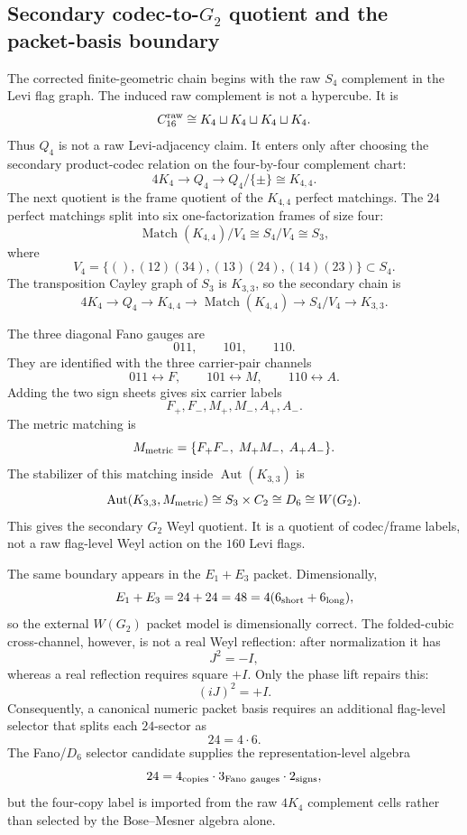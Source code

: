 
\subsection{Secondary codec-to-$G_2$ quotient and the packet-basis boundary}
\label{sec:bt682-secondary-g2-synthesis}

The corrected finite-geometric chain begins with the raw $S_4$ complement in the Levi flag graph.  The induced raw complement is not a hypercube.  It is
\[
C_{16}^{\rm raw}\cong K_4\sqcup K_4\sqcup K_4\sqcup K_4.
\]
Thus $Q_4$ is not a raw Levi-adjacency claim.  It enters only after choosing the secondary product-codec relation on the four-by-four complement chart:
\[
4K_4
\longrightarrow
Q_4
\longrightarrow
Q_4/\{\pm\}\cong K_{4,4}.
\]
The next quotient is the frame quotient of the $K_{4,4}$ perfect matchings.  The $24$ perfect matchings split into six one-factorization frames of size four:
\[
\operatorname{Match}(K_{4,4})/V_4
\cong
S_4/V_4
\cong S_3,
\]
where
\[
V_4=\{(),(12)(34),(13)(24),(14)(23)\}\subset S_4.
\]
The transposition Cayley graph of $S_3$ is $K_{3,3}$, so the secondary chain is
\[
4K_4
\to Q_4
\to K_{4,4}
\to \operatorname{Match}(K_{4,4})
\to S_4/V_4
\to K_{3,3}.
\]

The three diagonal Fano gauges are
\[
011,\qquad 101,\qquad 110.
\]
They are identified with the three carrier-pair channels
\[
011\leftrightarrow F,\qquad
101\leftrightarrow M,\qquad
110\leftrightarrow A.
\]
Adding the two sign sheets gives six carrier labels
\[
F_+,F_-,M_+,M_-,A_+,A_-.
\]
The metric matching is
\[
M_{\rm metric}=\{F_+F_-,\;M_+M_-,\;A_+A_-\}.
\]
The stabilizer of this matching inside $\operatorname{Aut}(K_{3,3})$ is
\[
\operatorname{Aut}(K_{3,3},M_{\rm metric})
\cong
S_3\times C_2
\cong D_6
\cong W(G_2).
\]
This gives the secondary $G_2$ Weyl quotient.  It is a quotient of codec/frame labels, not a raw flag-level Weyl action on the $160$ Levi flags.

The same boundary appears in the $E_1+E_3$ packet.  Dimensionally,
\[
E_1+E_3=24+24=48=4(6_{\rm short}+6_{\rm long}),
\]
so the external $W(G_2)$ packet model is dimensionally correct.  The folded-cubic cross-channel, however, is not a real Weyl reflection: after normalization it has
\[
J^2=-I,
\]
whereas a real reflection requires square $+I$.  Only the phase lift repairs this:
\[
(iJ)^2=+I.
\]
Consequently, a canonical numeric packet basis requires an additional flag-level selector that splits each $24$-sector as
\[
24=4\cdot6.
\]
The Fano/$D_6$ selector candidate supplies the representation-level algebra
\[
24=4_{\rm copies}\cdot 3_{\rm Fano\ gauges}\cdot2_{\rm signs},
\]
but the four-copy label is imported from the raw $4K_4$ complement cells rather than selected by the Bose--Mesner algebra alone.
